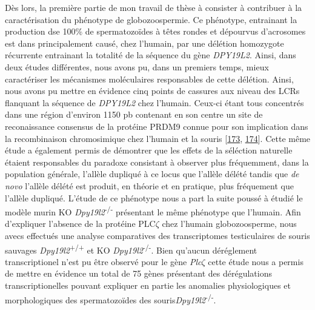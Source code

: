 \documentclass[12pt,twoside]{reedthesis}
\theoremstyle{definition}
\theoremstyle{definition}
\theoremstyle{remark}
\begin{document}
  Dès lors, la première partie de mon travail de thèse à consister à
  contribuer à la caractérisation du phénotype de globozoospermie. Ce
  phénotype, entrainant la production dse 100\% de spermatozoïdes à têtes
  rondes et dépourvus d'acrosomes est dans principalement causé, chez
  l'humain, par une délétion homozygote récurrente entrainant la totalité
  de la séquence du gène \emph{DPY19L2}. Ainsi, dans deux études
  différentes, nous avons pu, dans un premiers temps, mieux caractériser
  les mécanismes moléculaires responsables de cette délétion. Ainsi, nous
  avons pu mettre en évidence cinq points de cassures aux niveau des LCRs
  flanquant la séquence de \emph{DPY19L2} chez l'humain. Ceux-ci étant
  tous concentrés dans une région d'environ 1150 pb contenant en son
  centre un site de reconaissance consensus de la protéine PRDM9 connue
  pour son implication dans la recombinaison chromosimique chez l'humain
  et la souris {[}\protect\hyperlink{ref-Parvanov2010}{173},
  \protect\hyperlink{ref-Baudat2010}{174}{]}. Cette même étude a également
  permis de démontrer que les effets de la séléction naturelle étaient
  responsables du paradoxe consistant à observer plus fréquemment, dans la
  population générale, l'allèle dupliqué à ce locus que l'allèle délété
  tandis que \emph{de novo} l'allèle délété est produit, en théorie et en
  pratique, plus fréquement que l'allèle dupliqué. L'étude de ce phénotype
  nous a part la suite poussé à étudié le modèle murin KO
  \emph{Dpy19l2}\textsuperscript{-/-} présentant le même phénotype que
  l'humain. Afin d'expliquer l'absence de la protéine PLC\(\zeta\) chez
  l'humain globozoosperme, nous avecs effectués une analyse comparatives
  des transcriptomes testiculaires de souris sauvages
  \emph{Dpy19l2}\textsuperscript{+/+} et KO
  \emph{Dpy19l2}\textsuperscript{-/-}. Bien qu'aucun déréglement
  transcriptionel n'est pu être observé pour le gène \emph{Plc}\(\zeta\)
  cette étude nous a permis de mettre en évidence un total de 75 gènes
  présentant des dérégulations transcriptionelles pouvant expliquer en
  partie les anomalies physiologiques et morphologiques des spermatozoïdes
  des souris\emph{Dpy19l2}\textsuperscript{-/-}.
  
\end{document}
